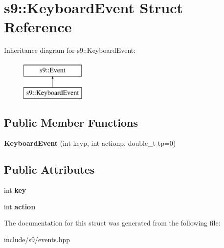 \hypertarget{structs9_1_1KeyboardEvent}{\section{s9\-:\-:\-Keyboard\-Event \-Struct \-Reference}
\label{structs9_1_1KeyboardEvent}
}
\-Inheritance diagram for s9\-:\-:\-Keyboard\-Event\-:\begin{figure}[H]
\begin{center}
\leavevmode
\includegraphics[height=2.000000cm]{structs9_1_1KeyboardEvent}
\end{center}
\end{figure}
\subsection*{\-Public \-Member \-Functions}
\begin{DoxyCompactItemize}
\item 
\hypertarget{structs9_1_1KeyboardEvent_a7d598c3b9f046fb45b1ffe13995e5ca8}{{\bfseries \-Keyboard\-Event} (int keyp, int actionp, double\-\_\-t tp=0)}\label{structs9_1_1KeyboardEvent_a7d598c3b9f046fb45b1ffe13995e5ca8}

\end{DoxyCompactItemize}
\subsection*{\-Public \-Attributes}
\begin{DoxyCompactItemize}
\item 
\hypertarget{structs9_1_1KeyboardEvent_ab1e7504602fbcf65946537704eef6b4b}{int {\bfseries key}}\label{structs9_1_1KeyboardEvent_ab1e7504602fbcf65946537704eef6b4b}

\item 
\hypertarget{structs9_1_1KeyboardEvent_ae166447666118a6289b25527003af9c3}{int {\bfseries action}}\label{structs9_1_1KeyboardEvent_ae166447666118a6289b25527003af9c3}

\end{DoxyCompactItemize}


\-The documentation for this struct was generated from the following file\-:\begin{DoxyCompactItemize}
\item 
include/s9/events.\-hpp\end{DoxyCompactItemize}
